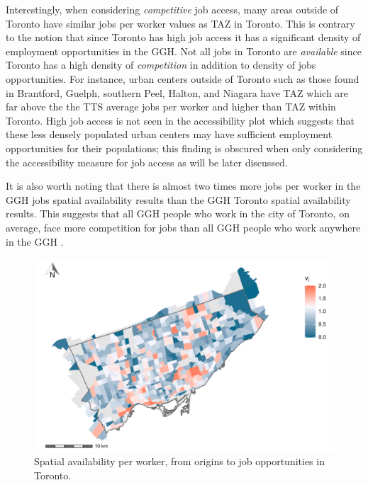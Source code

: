 \documentclass[]{elsarticle} %
\begin{document}
Interestingly, when considering \emph{competitive} job access, many
areas outside of Toronto have similar jobs per worker values as TAZ in
Toronto. This is contrary to the notion that since Toronto has high job
access it has a significant density of employment opportunities in the
GGH. Not all jobs in Toronto are \emph{available} since Toronto has a
high density of \emph{competition} in addition to density of jobs
opportunities. For instance, urban centers outside of Toronto such as
those found in Brantford, Guelph, southern Peel, Halton, and Niagara
have TAZ which are far above the the TTS average jobs per worker and
higher than TAZ within Toronto. High job access is not seen in the
accessibility plot which suggests that these less densely populated
urban centers may have sufficient employment opportunities for their
populations; this finding is obscured when only considering the
accessibility measure for job access as will be later discussed.

It is also worth noting that there is almost two times more jobs per
worker in the GGH jobs spatial availability results than the GGH Toronto
spatial availability results. This suggests that all GGH people who work
in the city of Toronto, on average, face more competition for jobs than
all GGH people who work anywhere in the GGH .

\begin{figure}
\includegraphics[width=1\linewidth]{Spatial-Availability-Refreshed_files/figure-latex/plot-avail-TO-per-worker-1} \caption{\label{fig:plot-avail-TO-per-worker}Spatial availability per worker, from origins to job opportunities in Toronto.}\label{fig:plot-avail-TO-per-worker}
\end{figure}
\end{document}
